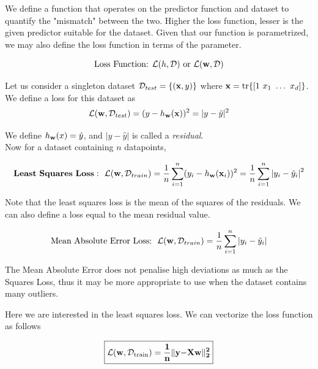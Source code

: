 We define a function that operates on the predictor function and dataset to quantify the "mismatch" between the two. Higher the loss function, lesser is the given predictor suitable for the dataset. Given that our function is parametrized, we may also define the loss function in terms of the parameter.

$$
  \text{Loss Function: } \mathcal{L}(h,\mathcal{D}) ~\text{or}~ \mathcal{L}(\mathbf{w},\mathcal{D})
$$

Let us consider a singleton dataset $\mathcal{D}_{test} =\{(\mathbf{x},y)\}$ where $\mathbf{x} = \tr{\left[1~x_1~\ldots~x_d\right]}$. We define a loss for this dataset as
$$
  \mathcal{L}(\mathbf{w},\mathcal{D}_{test}) = (y-h_{\mathbf{w}}(\mathbf{x}))^2 = |y-\hat{y}|^2
$$

We define \(h_{\mathbf{w}}(x) = \hat{y}\), and \(|y-\hat{y}|\) is called a \emph{residual}. \\

Now for a dataset containing $n$ datapoints,

$$
  \mathbf{Least\ Squares\ Loss:} \ \  \loss(\w,\D_{train}) = \frac{1}{n} \sum_{i=1}^n(y_i-h_\w(\x_i))^2 = \frac{1}{n} \sum_{i=1}^n \left|y_i - \hat{y}_i\right|^2
$$

Note that the least squares loss is the mean of the squares of the residuals. We can also define a loss equal to the mean residual value.

$$
  \text{Mean Absolute Error Loss:} \ \ \loss({\w,\D_{train}}) = \frac{1}{n} \sum_{i=1}^n \left|y_i - \hat{y}_i\right|
$$

The Mean Absolute Error does not penalise high deviations as much as the Squares Loss, thus it may be more appropriate to use when the dataset contains many outliers.
\begin{figure}[htbp]
  \centering
\end{figure}

Here we are interested in the least squares loss. We can vectorize the loss function as follows

$$
  \boxed{\mathbf{\mathcal{L}(\mathbf{w}, \mathcal{D}_{\text{train}}) = \frac{1}{n} \lVert \mathbf{y} \mathrm{-} X\mathbf{w} \rVert_2^2}}
$$

